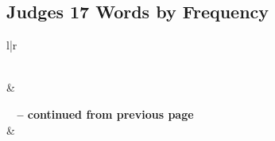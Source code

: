 \subsection{Judges 17 Words by Frequency}


\normalsize
 
\begin{center}
\begin{longtable}{l|r}
\caption[Judges 17 Words by Frequency]{Judges 17 Words by Frequency}\label{table:WordsbyFrequency for Judges 17} \\
\hline {} &  \\ \hline 
\endfirsthead
 
{{\bfseries \tablename\ \thetable{} -- continued from previous page}} \\  
\hline {} &  \\ \hline 
\endhead
 

\end{longtable}
\end{center}
